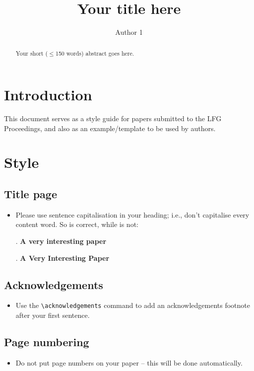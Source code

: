 \documentclass[linguex]{lfg-proc}
\title{Your title here}
\author{Author 1 \affiliation{Author 1's affiliation}%
}
\newcommand{\goodex}{\makebox[0pt][r]{\normalfont\ding{51}\ignorespaces}}
\newcommand{\badex}{\makebox[0pt][r]{\normalfont\ding{55}\ignorespaces}}
\begin{document}
\maketitle


\begin{abstract}
Your short ($\leq$150 words) abstract goes here.
\end{abstract}


\section{Introduction}

This document serves as a style guide for papers submitted to the LFG
Proceedings, and also as an example\slash template to be used by authors.

\section{Style}

\subsection{Title page}
\begin{itemize}
  \item Please use sentence capitalisation in your heading; i.e., don't
        capitalise every content word. So \Next is correct, while \NNext is not:

        \ex. \goodex\textbf{A very interesting paper}

        \ex. \badex\textbf{A Very Interesting Paper}

\end{itemize}

\subsection{Acknowledgements}
\begin{itemize}
  \item Use the \verb=\acknowledgements= command to add an acknowledgements
        footnote after your first sentence.
\end{itemize}

\subsection{Page numbering}
\begin{itemize}
  \item Do not put page numbers on your paper -- this will be done
        automatically.
\end{itemize}
\end{document}
